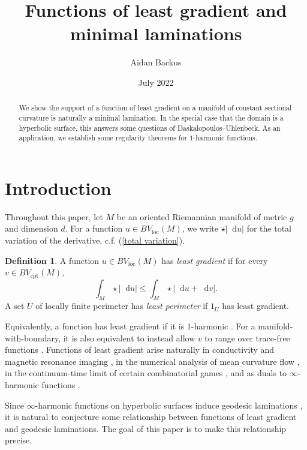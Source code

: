 \documentclass[reqno,10pt]{amsart}
\title{Functions of least gradient and minimal laminations}
\author{Aidan Backus}
\date{July 2022}
\newcommand*\dif{\mathop{}\!\mathrm{d}}
\newcommand{\dfn}[1]{\emph{#1}\index{#1}}
\newcommand{\loc}{\mathrm{loc}}
\newcommand{\cpt}{\mathrm{cpt}}
\theoremstyle{definition}
\newtheorem{definition}[theorem]{Definition}
\numberwithin{equation}{section}
\begin{document}
\begin{abstract}
We show the support of a function of least gradient on a manifold of constant sectional curvature is naturally a minimal lamination.
In the special case that the domain is a hyperbolic surface, this answers some questions of Daskalopoulos--Uhlenbeck.
As an application, we establish some regularity theorems for $1$-harmonic functions.
\end{abstract}

\maketitle



\section{Introduction}
Throughout this paper, let $M$ be an oriented Riemannian manifold of metric $g$ and dimension $d$.
For a function $u \in BV_\loc(M)$, we write $\star |\dif u|$ for the total variation of the derivative, c.f. (\ref{total variation}).

\begin{definition}\label{main definitions}
A function $u \in BV_\loc(M)$ has \dfn{least gradient} if for every $v \in BV_\cpt(M)$,
\begin{equation}\label{least gradient functional}
\int_M \star |\dif u| \leq \int_M \star |\dif u + \dif v|.
\end{equation}
A set $U$ of locally finite perimeter has \dfn{least perimeter} if $1_U$ has least gradient.
\end{definition}

Equivalently, a function has least gradient if it is $1$-harmonic \cite{Mazon14}. For a manifold-with-boundary, it is also equivalent to instead allow $v$ to range over trace-free functions \cite[Theorem 2.2]{Sternberg93}.
Functions of least gradient arise naturally in conductivity and magnetic resonance imaging \cite{Tamasan2019, Joy09}, in the numerical analysis of mean curvature flow \cite{Thomas05}, in the continuum-time limit of certain combinatorial games \cite{Kohn06}, and as duals to $\infty$-harmonic functions \cite{daskalopoulos2020transverse}.

Since $\infty$-harmonic functions on hyperbolic surfaces induce geodesic laminations \cite{daskalopoulos2020transverse}, it is natural to conjecture some relationship between functions of least gradient and geodesic laminations.
The goal of this paper is to make this relationship precise.
\end{document}
